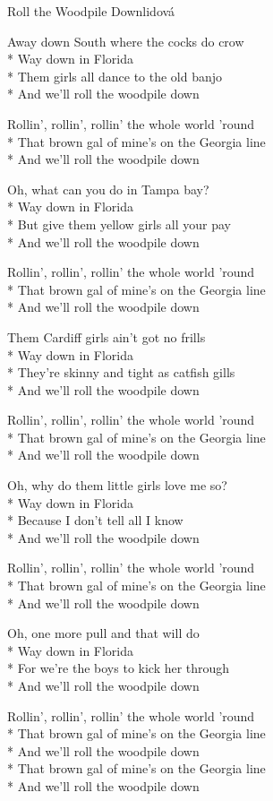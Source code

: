 \documentclass[10.5pt]{book}
\begin{document}
\begin{poem}{Roll the Woodpile Down}{lidová}

\settowidth{\versewidth}{Rollin', rollin', rollin' the whole world 'round}

Away down South where the cocks do crow\\*
Way down in Florida\\*
Them girls all dance to the old banjo\\*
And we'll roll the woodpile down

Rollin', rollin', rollin' the whole world 'round\\*
That brown gal of mine's on the Georgia line\\*
And we'll roll the woodpile down

Oh, what can you do in Tampa bay?\\*
Way down in Florida\\*
But give them yellow girls all your pay\\*
And we'll roll the woodpile down

Rollin', rollin', rollin' the whole world 'round\\*
That brown gal of mine's on the Georgia line\\*
And we'll roll the woodpile down

Them Cardiff girls ain't got no frills\\*
Way down in Florida\\*
They're skinny and tight as catfish gills\\*
And we'll roll the woodpile down

Rollin', rollin', rollin' the whole world 'round\\*
That brown gal of mine's on the Georgia line\\*
And we'll roll the woodpile down

Oh, why do them little girls love me so?\\*
Way down in Florida\\*
Because I don't tell all I know\\*
And we'll roll the woodpile down

Rollin', rollin', rollin' the whole world 'round\\*
That brown gal of mine's on the Georgia line\\*
And we'll roll the woodpile down

Oh, one more pull and that will do\\*
Way down in Florida\\*
For we're the boys to kick her through\\*
And we'll roll the woodpile down

Rollin', rollin', rollin' the whole world 'round\\*
That brown gal of mine's on the Georgia line\\*
And we'll roll the woodpile down\\*
That brown gal of mine's on the Georgia line\\*
And we'll roll the woodpile down

\end{poem}
\end{document}
